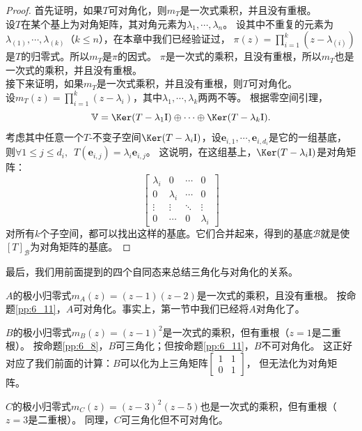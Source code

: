 \documentclass[12pt,UTF8]{ctexbook}
\begin{document}
\begin{proof} %
    首先证明，如果$T$可对角化，则$m_T$是一次式乘积，并且没有重根。\\
    设$T$在某个基上为对角矩阵，其对角元素为$\lambda_1, \cdots, \lambda_n$。
    设其中不重复的元素为$\lambda_{(1)}, \cdots, \lambda_{(k)}$（$k \leqslant n$），在本章中我们已经验证过，
    $ \pi(z) = \prod_{i=1}^k (z - \lambda_{(i)})$是$T$的归零式。所以$m_T$是$\pi$的因式。
    $\pi$是一次式的乘积，且没有重根，所以$m_T$也是一次式的乘积，并且没有重根。\\
    接下来证明，如果$m_T$是一次式乘积，并且没有重根，则$T$可对角化。\\
    设$m_T(z) = \prod_{i=1}^k(z - \lambda_i)$，其中$\lambda_1, \cdots , \lambda_k$两两不等。
    根据零空间引理，
    $$\mathbb{V} = \Ker (T - \lambda_1\mathrm{I}) \oplus \cdots \oplus \Ker (T - \lambda_k\mathrm{I}).$$
    考虑其中任意一个$T$-不变子空间$\Ker (T - \lambda_i\mathrm{I})$，设$\mathbf{e}_{i,1}, \cdots , \mathbf{e}_{i,d_i}$是它的一组基底，
    则$\forall 1 \leqslant j \leqslant d_i, \,\,\, T(\mathbf{e}_{i,j}) = \lambda_i \mathbf{e}_{i,j}$。
    这说明，在这组基上，$\Ker (T - \lambda_i\mathrm{I})$是对角矩阵：
    $$ \begin{bmatrix}
        \lambda_i & 0 & \cdots & 0 \\
        0 & \lambda_i & \cdots & 0 \\
        \vdots & \vdots & \ddots & \vdots \\
        0 & \cdots & 0 & \lambda_i
    \end{bmatrix}$$
    对所有$k$个子空间，都可以找出这样的基底。它们合并起来，得到的基底$\mathcal{B}$就是使$[T]_\mathcal{B}$为对角矩阵的基底。

\end{proof}

最后，我们用前面提到的四个自同态来总结三角化与对角化的关系。

$A$的极小归零式$m_A(z) = (z-1)(z-2)$是一次式的乘积，且没有重根。
按命题\ref{pp:6_11}，$A$可对角化。事实上，第一节中我们已经将$A$对角化了。

$B$的极小归零式$m_B(z) = (z-1)^2$是一次式的乘积，但有重根（$z=1$是二重根）。
按命题\ref{pp:6_8}，$B$可三角化；但按命题\ref{pp:6_11}，$B$不可对角化。
这正好对应了我们前面的计算：$B$可以化为上三角矩阵$\begin{bmatrix} 1 & 1 \\ 0 & 1 \end{bmatrix}$，
但无法化为对角矩阵。

$C$的极小归零式$m_C(z) = (z-3)^2(z-5)$也是一次式的乘积，但有重根（$z=3$是二重根）。
同理，$C$可三角化但不可对角化。
\end{document}
